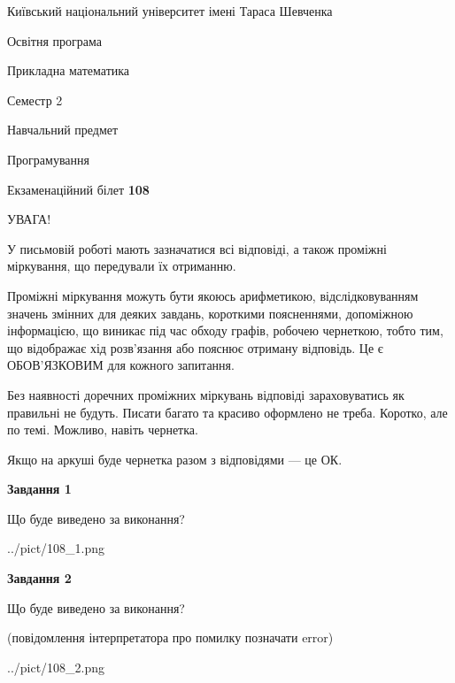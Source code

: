 \documentclass[12pt, ukrainian]{article}
\begin{document}
{{\begin {small}\par
{ \center  Київський національний університет імені Тараса Шевченка \par}
{\parbox {5 cm}{Освітня програма \hfill}{\parbox {7 cm}{Прикладна математика\hfill}}\parbox {6 cm}{\hfill Семестр 2}}\par
{\parbox {5 cm} {Навчальний предмет \hfill}\parbox {7 cm}{Програмування \hfill}\parbox {6cm}{\hfill}\par}\vspace{-7pt} \end{small}}{\center Екзаменаційний білет \No \textbf
{ 108 }\par}}
{
\begin {large}
УВАГА!

У письмовій роботі мають зазначатися всі відповіді, а також проміжні міркування, що передували їх отриманню.

Проміжні міркування можуть бути якоюсь арифметикою, відслідковуванням зна\-чень змінних для деяких завдань,
короткими поясненнями, допоміжною інформацією, що виникає під час обходу графів, робочею чернеткою,
тобто тим, що відображає хід розв’язання або пояснює отриману відповідь.
Це є ОБОВ’ЯЗКОВИМ для кожного запитання.

Без наявності доречних проміжних міркувань відповіді зараховуватись як правиль\-ні не будуть.
Писати багато та красиво оформлено не треба. Коротко, але по темі. Можли\-во, навіть чернетка.

Якщо на аркуші буде чернетка разом з відповідями --- це ОК.

\newpage

{\begin {center}\textbf{Завдання 1}\end {center}}\par
Що буде виведено за виконання?\par
\begin{center}
	{../pict/108_1.png}
\end{center}
\newpage

{\begin {center}\textbf{Завдання 2}\end {center}}\par
Що буде виведено за виконання?\par
 (повідомлення інтерпретатора про помилку позначати error)\par
\begin{center}
	{../pict/108_2.png}
\end{center}
\newpage


\end{large}}
\end{document}
